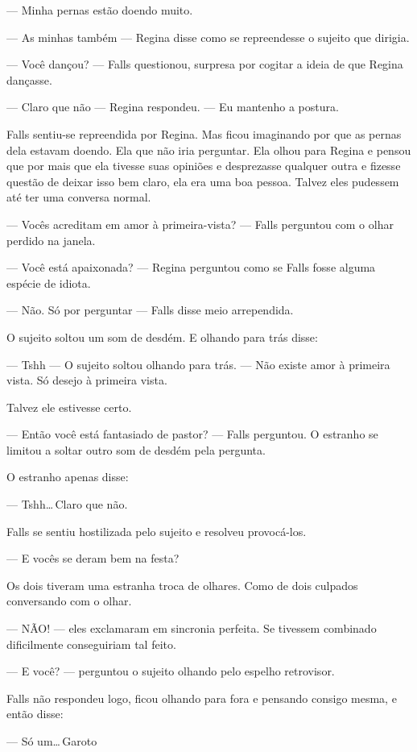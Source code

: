 --- Minha pernas estão doendo muito.

--- As minhas também --- Regina disse como se repreendesse o sujeito que dirigia.

--- Você dançou? --- Falls questionou, surpresa por cogitar a ideia de que Regina dançasse.

--- Claro que não --- Regina respondeu. --- Eu mantenho a postura.

Falls sentiu-se repreendida por Regina. Mas ficou imaginando por que as pernas dela estavam doendo. Ela que não iria perguntar. Ela olhou para Regina e pensou que por mais que ela tivesse suas opiniões e desprezasse qualquer outra e fizesse questão de deixar isso bem claro, ela era uma boa pessoa. Talvez eles pudessem até ter uma conversa normal.

--- Vocês acreditam em amor à primeira-vista? --- Falls perguntou com o olhar perdido na janela.

--- Você está apaixonada? --- Regina perguntou\mudanca{,} como se Falls fosse alguma espécie de idiota.

--- Não. Só por perguntar --- Falls disse meio arrependida.

O sujeito soltou um som de desdém. E olhando para trás disse:

--- Tshh --- O sujeito soltou olhando para trás. --- Não existe amor à primeira vista. Só desejo à primeira vista.

Talvez ele estivesse certo.

--- Então você está fantasiado de pastor? --- Falls perguntou. O estranho se limitou a soltar outro som de desdém pela pergunta.

O estranho apenas disse:

--- Tshh\ldots\,Claro que não.

Falls se sentiu hostilizada pelo sujeito e resolveu provocá-los.

--- E vocês se deram bem na festa?

Os dois tiveram uma estranha troca de olhares. Como de dois culpados conversando com o olhar.

--- NÃO! --- eles exclamaram em sincronia perfeita. Se tivessem combinado dificilmente conseguiriam tal feito.

--- E você? --- perguntou o sujeito olhando pelo espelho retrovisor.

Falls não respondeu logo, ficou olhando para fora e pensando consigo mesma, e então disse:

--- Só um\ldots\,Garoto
